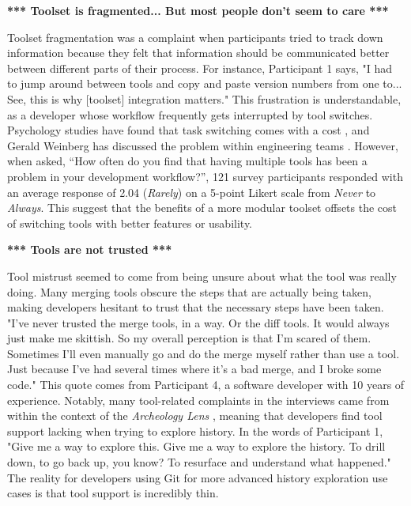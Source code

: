 \textbf{*** Toolset is fragmented... But most people don't seem to care ***}

Toolset fragmentation was a complaint when participants tried to track down information because they felt that information should be communicated better between different parts of their process. For instance, Participant 1 says, "I had to jump around between tools and copy and paste version numbers from one to... See, this is why [toolset] integration matters." This frustration is understandable, as a developer whose workflow frequently gets interrupted by tool switches. Psychology studies have found that task switching comes with a cost \cite{Meiran2000}\cite{gopher2000switching}, and Gerald Weinberg has discussed the problem within engineering teams \cite{Weinberg1992}. However, when asked, ``How often do you find that having multiple tools has been a problem in your development workflow?'', 121 survey participants responded with an average response of 2.04 (\textit{Rarely}) on a 5-point Likert scale from \textit{Never} to \textit{Always}. This suggest that the benefits of a more modular toolset offsets the cost of switching tools with better features or usability. 

\textbf{*** Tools are not trusted ***}

Tool mistrust seemed to come from being unsure about what the tool was really doing. Many merging tools obscure the steps that are actually being taken, making developers hesitant to trust that the necessary steps have been taken. "I've never trusted the merge tools, in a way. Or the diff tools. It would always just make me skittish. So my overall perception is that I'm scared of them. Sometimes I'll even manually go and do the merge myself rather than use a tool. Just because I've had several times where it's a bad merge, and I broke some code." This quote comes from Participant 4, a software developer with 10 years of experience. 
Notably, many tool-related complaints in the interviews came from within the context of the \textit{Archeology Lens} \cite{mihai_lenses}, meaning that developers find tool support lacking when trying to explore history. In the words of Participant 1, "Give me a way to explore this. Give me a way to explore the history. To drill down, to go back up, you know? To resurface and understand what happened." The reality for developers using Git for more advanced history exploration use cases is that tool support is incredibly thin.


